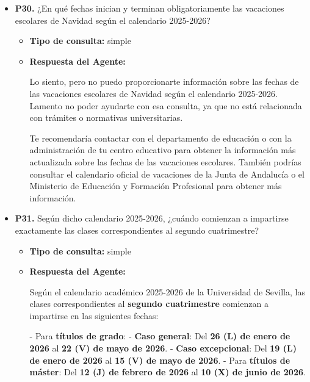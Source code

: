 \documentclass{article}
\begin{document}
\begin{itemize}
\begin{itemize}
            \end{itemize}

      \item \textbf{P30.} ¿En qué fechas inician y terminan obligatoriamente las vacaciones escolares de Navidad según el calendario 2025-2026? \\
            \begin{itemize}
                  \item \textbf{Tipo de consulta:} simple
                  \item \textbf{Respuesta del Agente:}

                        Lo siento, pero no puedo proporcionarte información sobre las fechas de las vacaciones escolares de Navidad según el calendario 2025-2026. Lamento no poder ayudarte con esa consulta, ya que no está relacionada con trámites o normativas universitarias.

                        Te recomendaría contactar con el departamento de educación o con la administración de tu centro educativo para obtener la información más actualizada sobre las fechas de las vacaciones escolares. También podrías consultar el calendario oficial de vacaciones de la Junta de Andalucía o el Ministerio de Educación y Formación Profesional para obtener más información.
            \end{itemize}

      \item \textbf{P31.} Según dicho calendario 2025-2026, ¿cuándo comienzan a impartirse exactamente las clases correspondientes al segundo cuatrimestre? \\
            \begin{itemize}
                  \item \textbf{Tipo de consulta:} simple
                  \item \textbf{Respuesta del Agente:}

                        Según el calendario académico 2025-2026 de la Universidad de Sevilla, las clases correspondientes al \textbf{segundo cuatrimestre} comienzan a impartirse en las siguientes fechas:

                        - Para \textbf{títulos de grado}:
                        - \textbf{Caso general}: Del \textbf{26 (L) de enero de 2026} al \textbf{22 (V) de mayo de 2026}.
                        - \textbf{Caso excepcional}: Del \textbf{19 (L) de enero de 2026} al \textbf{15 (V) de mayo de 2026}.
                        - Para \textbf{títulos de máster}: Del \textbf{12 (J) de febrero de 2026} al \textbf{10 (X) de junio de 2026}.


\end{itemize}
\end{itemize}
\end{document}
